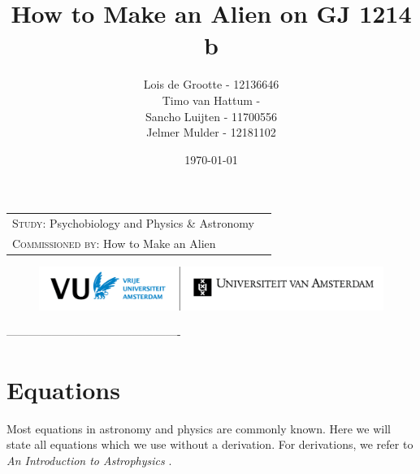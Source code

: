 \documentclass[12pt,a4paper]{article}
\author{Lois de Grootte - 12136646\\
Timo van Hattum - \\
Sancho Luijten - 11700556\\
Jelmer Mulder - 12181102}
\title{How to Make an Alien on GJ 1214 b}
\date{\today}
\begin{document}
\begin{titlepage}
\maketitle
\thispagestyle{empty} %

\vfill

 \begin{table}[h]
  \label{tab:credits}
  \begin{tabular}{l l}
   \textsc{Study}: Psychobiology and Physics \& Astronomy\\
   \textsc{Commissioned by}: How to Make an Alien \\
  \end{tabular}
  \vspace{3ex}
 \end{table}
 
\begin{figure}
  \centering  
  \includegraphics[width=150mm]{logo-combi-vu-uva-nl}\\   %
  \vspace{-13ex}
 \end{figure}

\end{titlepage}

\setcounter{page}{2}    
\suppressfloats[t] 
---------------------------------------------- \\

\section{Equations}
Most equations in astronomy and physics are commonly known. Here we will state all equations which we use without a derivation. For derivations, we refer to \textit{An Introduction to Astrophysics} \cite{introduction_to_astrophysics}.
\end{document}
